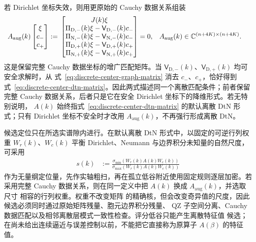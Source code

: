 若 Dirichlet 坐标失效，则用更原始的 Cauchy 数据关系组装
\begin{align}
  A_{\mathrm{aug}}(k)
  \begin{bmatrix}\xi\\c_-\\c_+\end{bmatrix}
  &:={}
  \begin{bmatrix}
    J(k)\xi\\
    \Pi_{\mathrm D,-}(k)\xi
      -\mathsf V_{\mathrm D,-}(k)c_-\\
    \Pi_{\mathrm N,-}(k)\xi
      -\mathsf V_{\mathrm N,-}(k)c_-\\
    \Pi_{\mathrm D,+}(k)\xi
      -\mathsf V_{\mathrm D,+}(k)c_+\\
    \Pi_{\mathrm N,+}(k)\xi
      -\mathsf V_{\mathrm N,+}(k)c_+
  \end{bmatrix}
  =0,
  &
  A_{\mathrm{aug}}(k)
  &\in\mathbb{C}^{(n+4K)\times(n+4K)}.
  \label{eq:discrete-center-graph-matrix}
\end{align}
这是保留完整 Cauchy 数据坐标的增广匹配矩阵。当
$\mathsf V_{\mathrm D,-}(k)$、$\mathsf V_{\mathrm D,+}(k)$ 均可安全求解时，从
式~\eqref{eq:discrete-center-graph-matrix} 消去 $c_-$、$c_+$，恰好得到
式~\eqref{eq:discrete-center-dtn-matrix}。因此两式描述同一个离散匹配条件；前者保留完整
Cauchy 数据关系，后者只是它在安全 Dirichlet 坐标下的降维形式。若无特别说明，
$A(k)$ 始终指式~\eqref{eq:discrete-center-dtn-matrix} 的默认离散 DtN 形式；只有
Dirichlet 坐标不安全时才改用 $A_{\mathrm{aug}}(k)$，不再强行形成离散 DtN。

候选定位只在所选实谱隙内进行。在默认离散 DtN 形式中，以固定的可逆行列权重
$W_r(k)$、$W_c(k)$ 平衡 Dirichlet、Neumann 与边界积分未知量的自然尺度，可采用
\begin{align}
  s(k)
  &:=\frac{\sigma_{\min}\!\left(
    W_r(k)A(k)W_c(k)\right)}
  {\sigma_{\max}\!\left(
    W_r(k)A(k)W_c(k)\right)}
  \label{eq:discrete-candidate-score}
\end{align}
作为无量纲定位量，先作实轴粗扫，再在孤立低谷附近使用固定规则逐层加密。若采用完整
Cauchy 数据关系，则在同一定义中把 $A(k)$ 换成 $A_{\mathrm{aug}}(k)$，并选取尺寸
相容的行列权重。权重不改变矩阵
的精确核，但会改变奇异值的尺度，因此候选必须同时通过原始矩阵残量、胞元边界积分残量、
QZ 子空间分离、Cauchy 数据匹配以及相邻离散层模式一致性检查。评分低谷只能产生离散特征值
候选；在尚未给出连续逼近与误差控制以前，不能把它直接称为原算子 $A(\beta)$ 的特征值。

